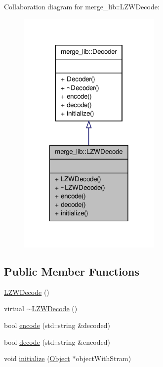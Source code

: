 Collaboration diagram for merge\-\_\-lib\-:\-:L\-Z\-W\-Decode\-:
\nopagebreak
\begin{figure}[H]
\begin{center}
\leavevmode
\includegraphics[width=198pt]{d6/db4/classmerge__lib_1_1_l_z_w_decode__coll__graph}
\end{center}
\end{figure}
\subsection*{Public Member Functions}
\begin{DoxyCompactItemize}
\item 
\hyperlink{classmerge__lib_1_1_l_z_w_decode_a37aed28d6f807081497bec6dbf64f3e3}{L\-Z\-W\-Decode} ()
\item 
virtual \hyperlink{classmerge__lib_1_1_l_z_w_decode_a7033f5929123a8cfdf9d5ceff69512b6}{$\sim$\-L\-Z\-W\-Decode} ()
\item 
bool \hyperlink{classmerge__lib_1_1_l_z_w_decode_a3189c2747dcdc79ca3e3719dc8d06e2a}{encode} (std\-::string \&decoded)
\item 
bool \hyperlink{classmerge__lib_1_1_l_z_w_decode_ae9e21b398f133e575c6b1e11a8f7ea30}{decode} (std\-::string \&encoded)
\item 
void \hyperlink{classmerge__lib_1_1_l_z_w_decode_a6008185d012afcaf7a73b3070afef4ea}{initialize} (\hyperlink{classmerge__lib_1_1_object}{Object} $\ast$object\-With\-Stram)
\end{DoxyCompactItemize}


